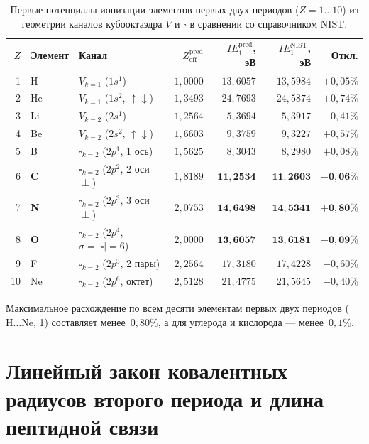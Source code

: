 \begin{table}[htbp]
\centering
\caption{Первые потенциалы ионизации элементов первых двух периодов ($Z=1\ldots 10$) из геометрии каналов кубооктаэдра $V$ и $\square$ в сравнении со справочником NIST.}
\label{tab:chem-ie-z1-10}
\begin{tabular}{rllrrrr}
\toprule
$Z$ & Элемент & Канал & $Z_{\mathrm{eff}}^{\mathrm{pred}}$ & $IE_1^{\mathrm{pred}}$, эВ & $IE_1^{\mathrm{NIST}}$, эВ & Откл. \\
\midrule
1  & H  & $V_{k=1}$ ($1s^1$)                   & $1{,}0000$ & $13{,}6057$ & $13{,}5984$ & $+0{,}05\%$ \\
2  & He & $V_{k=1}$ ($1s^2$, $\uparrow\downarrow$) & $1{,}3493$ & $24{,}7693$ & $24{,}5874$ & $+0{,}74\%$ \\
3  & Li & $V_{k=2}$ ($2s^1$)                   & $1{,}2564$ & $5{,}3694$  & $5{,}3917$  & $-0{,}41\%$ \\
4  & Be & $V_{k=2}$ ($2s^2$, $\uparrow\downarrow$) & $1{,}6603$ & $9{,}3759$  & $9{,}3227$  & $+0{,}57\%$ \\
5  & B  & $\square_{k=2}$ ($2p^1$, 1 ось)      & $1{,}5625$ & $8{,}3043$  & $8{,}2980$  & $+0{,}08\%$ \\
6  & \textbf{C}  & $\square_{k=2}$ ($2p^2$, 2 оси $\perp$) & $1{,}8189$ & $\mathbf{11{,}2534}$ & $\mathbf{11{,}2603}$ & $\mathbf{-0{,}06\%}$ \\
7  & \textbf{N}  & $\square_{k=2}$ ($2p^3$, 3 оси $\perp$) & $2{,}0753$ & $\mathbf{14{,}6498}$ & $\mathbf{14{,}5341}$ & $\mathbf{+0{,}80\%}$ \\
8  & \textbf{O}  & $\square_{k=2}$ ($2p^4$, $\sigma=|\square|=6$) & $2{,}0000$ & $\mathbf{13{,}6057}$ & $\mathbf{13{,}6181}$ & $\mathbf{-0{,}09\%}$ \\
9  & F  & $\square_{k=2}$ ($2p^5$, 2 пары)     & $2{,}2564$ & $17{,}3180$ & $17{,}4228$ & $-0{,}60\%$ \\
10 & Ne & $\square_{k=2}$ ($2p^6$, октет)      & $2{,}5128$ & $21{,}4775$ & $21{,}5645$ & $-0{,}40\%$ \\
\bottomrule
\end{tabular}
\end{table}

Максимальное расхождение по всем десяти элементам первых двух периодов ($\text{H}\ldots\text{Ne}$, \cref{tab:chem-ie-z1-10})
составляет менее~$0{,}80\%$, а для углерода и кислорода --- менее~$0{,}1\%$.

\section{Линейный закон ковалентных радиусов второго периода и длина пептидной связи}
\label{sec:chem-covalent-radii}

